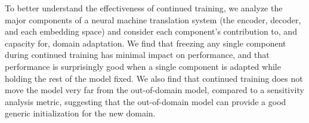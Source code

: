 To better understand the effectiveness of continued training,  we analyze the major components of a neural machine translation system (the encoder, decoder, and each embedding space) and consider each component's contribution to, and capacity for, domain adaptation. We find that freezing any single component during continued training has minimal impact on performance, and that performance is surprisingly good when a single component is adapted while holding the rest of the model fixed. We also find that continued training does not move the model very far from the out-of-domain model, compared to a sensitivity analysis metric, suggesting that the out-of-domain model can provide a good generic initialization for the new domain.
